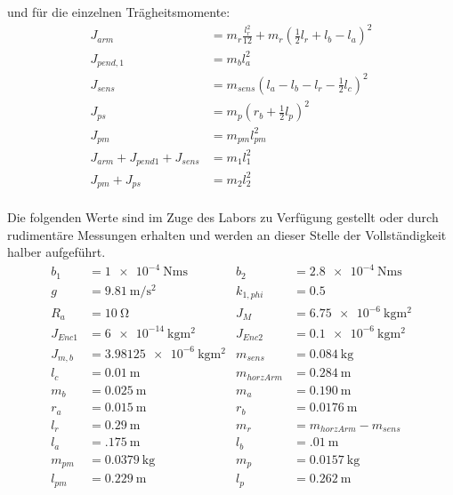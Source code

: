und für die einzelnen Trägheitsmomente:
\begin{align*}
J_{arm} &= m_r \frac{l^2_r}{12}+m_r(\frac{1}{2}l_r+l_b-l_a)^2 \\
J_{pend,1} &= m_bl^2_a \\
J_{sens} &= m_{sens}(l_a-l_b-l_r-\frac{1}{2}l_c)^2 \\
J_{ps} &= m_p(r_b+\frac{1}{2}l_p)^2 \\
J_{pm} &= m_{pm}l^2_{pm} \\
J_{arm}+J_{pend1}+J_{sens} &= m_1l^2_1 \\ 
J_{pm}+J_{ps} &= m_2l^2_2 \\
\end{align*}

Die folgenden Werte sind im Zuge des Labors zu Verfügung gestellt oder durch rudimentäre Messungen erhalten und werden an dieser Stelle der Vollständigkeit halber aufgeführt. 
\begin{align*}
b_1 &= \SI{1e-4}{\newton\metre\second} &
b_2 &= \SI{2.8e-4}{\newton\metre\second} \\
g &= \SI{9.81}{\metre\per\square\second} &
k_{1,phi} &= \SI{0.5}{}\\
R_a &= \SI{10}{\ohm} &
J_M  &=  \SI{6.75e-6}{\kilo\gram\square\metre}  \\        %
J_{Enc1}  &=  \SI{6e-14}{\kilo\gram\square\metre}  &        %
J_{Enc2}  &=  \SI{0.1e-6}{\kilo\gram\square\metre}  \\     %
J_{m,b}  &=  \SI{3.98125e-6}{\kilo\gram\square\metre}  &     %
m_{sens}  &=  \SI{0.084}{\kilo\gram}  \\
l_c  &=  \SI{0.01}{\metre}  &
m_{horzArm} &= \SI{0.284}{\metre} \\
m_b &= \SI{0.025}{\metre}  &
m_a &= \SI{0.190}{\metre} \\
r_a &= \SI{0.015}{\metre}  &
r_b &= \SI{0.0176}{\metre} \\
l_r &= \SI{0.29}{\metre} &
m_r  &=  m_{horzArm} - m_{sens}\\
l_a &= \SI{.175}{\metre} &
l_b &= \SI{.01}{\metre}\\
m_{pm} &= \SI{0.0379}{\kilo\gram} &
m_p &= \SI{0.0157}{\kilo\gram}\\
l_{pm} &= \SI{0.229}{\metre} &
l_p &= \SI{0.262}{\metre}\\
\end{align*}


